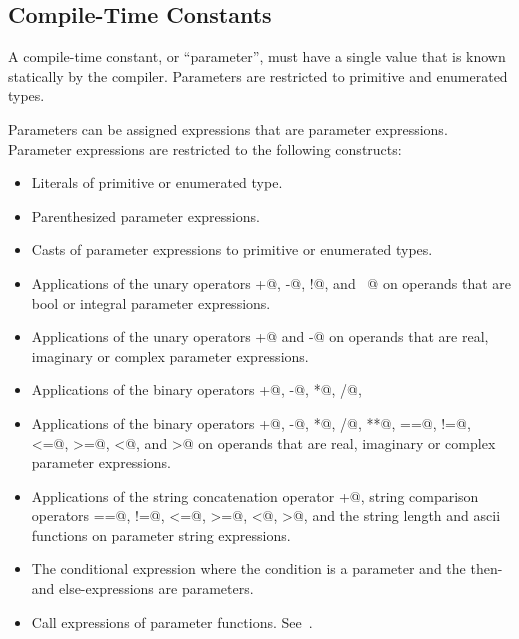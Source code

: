 \subsection{Compile-Time Constants}
\label{Compile-Time_Constants}

A compile-time constant, or ``parameter'', must have a single value that is
known statically by the compiler.  Parameters are restricted to
primitive and enumerated types.

Parameters can be assigned expressions that are parameter expressions.
Parameter expressions are restricted to the following constructs:
\begin{itemize}
\item
 Literals of primitive or enumerated type.
\item
 Parenthesized parameter expressions.
\item
 Casts of parameter expressions to primitive or enumerated types.
\item
 Applications of the unary operators \verb@+@, \verb@-@, \verb@!@,
 and \verb@~@ on operands that are bool or integral parameter
 expressions.
\item
 Applications of the unary operators \verb@+@ and \verb@-@ on operands that are
 real, imaginary or complex parameter
 expressions.
\item
 Applications of the binary operators \verb@+@, \verb@-@, \verb@*@, \verb@/@, \verb@%@, \verb@**@, \verb@&&@, \verb@||@, \verb@&@, \verb@|@, \verb@^@, \verb@<<@, \verb@>>@, \verb@==@, \verb@!=@, \verb@<=@, \verb@>=@, \verb@<@, and \verb@>@ on operands that are bool or integral parameter expressions.
\item
 Applications of the binary
 operators \verb@+@, \verb@-@, \verb@*@, \verb@/@, \verb@**@, \verb@==@, \verb@!=@, \verb@<=@, \verb@>=@, \verb@<@,
 and \verb@>@ on operands that are real, imaginary or complex parameter expressions.
\item
 Applications of the string concatenation operator \verb@+@, string comparison operators \verb@==@, \verb@!=@, \verb@<=@, \verb@>=@, \verb@<@, \verb@>@, and the string length and ascii functions on parameter string expressions.
\item
 The conditional expression where the condition is a parameter and the
 then- and else-expressions are parameters.
\item
 Call expressions of parameter functions.  See~.
\end{itemize}

